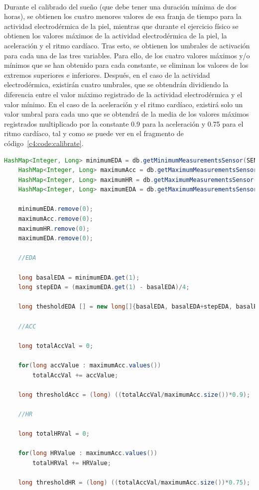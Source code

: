 \paragraph{}
Durante el calibrado del sueño (que debe tener una duración mínima de dos horas), se obtienen los cuatro menores valores de esa franja de tiempo para la actividad electrodérmica de la piel, mientras que durante el ejercicio físico se obtienen los valores máximos de la actividad electrodérmica de la piel, la aceleración y el ritmo cardíaco. Tras esto, se obtienen los umbrales de activación para cada una de las tres variables. Para ello, de los cuatro valores máximos y/o mínimos que se han obtenido para cada constante, se eliminan los valores de los extremos superiores e inferiores. Después, en el caso de la actividad electrodérmica, existirán cuatro umbrales, que se obtendrán dividiendo la diferencia entre el valor máximo registrado de la actividad electrodérmica y el valor mínimo. En el caso de la aceleración y el ritmo cardíaco, existirá solo un valor umbral para cada uno que se obtendrá de la media de los valores máximos registrados multiplicado por la constante 0.9 para la aceleración y 0.75 para el ritmo cardíaco, tal y como se puede ver en el fragmento de código~\ref{c4:code:calibrate}.

\begin{lstlisting}[language=Java, caption=Obtención de los umbrales de las constantes fisiológicas, label=c4:code:calibrate, stepnumber=1]
    HashMap<Integer, Long> minimumEDA = db.getMinimumMeasurementsSensor(SENSOR_EDA);
    HashMap<Integer, Long> maximumAcc = db.getMaximumMeasurementsSensor(SENSOR_ACC);
    HashMap<Integer, Long> maximumHR = db.getMaximumMeasurementsSensor(SENSOR_HR);
    HashMap<Integer, Long> maximumEDA = db.getMaximumMeasurementsSensor(SENSOR_EDA);
    
    minimumEDA.remove(0);
    maximumAcc.remove(0);
    maximumHR.remove(0);
    maximumEDA.remove(0);
    
    //EDA
    
    long basalEDA = minimumEDA.get(1);
    long stepEDA = (maximumEDA.get(1) - basalEDA)/4;
    
    long thesholdEDA [] = new long[]{basalEDA, basalEDA+stepEDA, basalEDA+stepEDA*2, basalEDA+stepEDA*3, basalEDA+stepEDA*4};
    
    //ACC
    
    long totalAccVal = 0;

    for(long accValue : maximumAcc.values())
        totalAccVal += accValue;

    long thresholdAcc = (long) ((totalAccVal/maximumAcc.size())*0.9);
    
    //HR
    
    long totalHRVal = 0;

    for(long HRValue : maximumAcc.values())
        totalHRVal += HRValue;

    long thresholdHR = (long) ((totalAccVal/maximumAcc.size())*0.75);    

\end{lstlisting}

